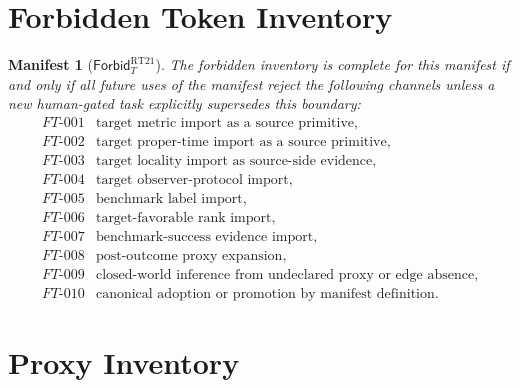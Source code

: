 \documentclass[11pt]{article}
\newcommand{\ForbidT}{\mathsf{Forbid}_{T}}
\newtheorem{manifest}{Manifest}
\begin{document}
\section{Forbidden Token Inventory}

\begin{manifest}[\(\ForbidT^{\mathrm{RT21}}\)]
The forbidden inventory is complete for this manifest if and only if all
future uses of the manifest reject the following channels unless a new
human-gated task explicitly supersedes this boundary:
\[
\begin{array}{ll}
FT\text{-}001 & \text{target metric import as a source primitive},\\
FT\text{-}002 & \text{target proper-time import as a source primitive},\\
FT\text{-}003 & \text{target locality import as source-side evidence},\\
FT\text{-}004 & \text{target observer-protocol import},\\
FT\text{-}005 & \text{benchmark label import},\\
FT\text{-}006 & \text{target-favorable rank import},\\
FT\text{-}007 & \text{benchmark-success evidence import},\\
FT\text{-}008 & \text{post-outcome proxy expansion},\\
FT\text{-}009 & \text{closed-world inference from undeclared proxy or edge absence},\\
FT\text{-}010 & \text{canonical adoption or promotion by manifest definition}.
\end{array}
\]
\end{manifest}

\section{Proxy Inventory}
\end{document}
